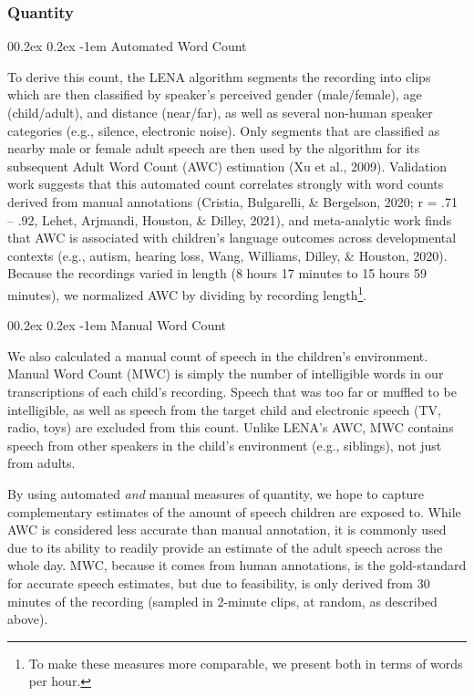 \documentclass[
  man,floatsintext]{apa6}
\makeatletter
\let\oldparagraph\paragraph
\renewcommand{\paragraph}[1]{\oldparagraph{#1}\mbox{}}
\renewcommand{\paragraph}{\@startsection{paragraph}{4}{\parindent}%
  {0\baselineskip \@plus 0.2ex \@minus 0.2ex}%
  {-1em}%
  {\normalfont\normalsize\bfseries\itshape\typesectitle}}
\makeatother
\begin{document}
\hypertarget{quantity}{%
\subsubsection{Quantity}\label{quantity}}

\hypertarget{automated-word-count}{%
\paragraph{Automated Word Count}\label{automated-word-count}}

To derive this count, the LENA algorithm segments the recording into clips which are then classified by speaker's perceived gender (male/female), age (child/adult), and distance (near/far), as well as several non-human speaker categories (e.g., silence, electronic noise). Only segments that are classified as nearby male or female adult speech are then used by the algorithm for its subsequent Adult Word Count (AWC) estimation (Xu et al., 2009). Validation work suggests that this automated count correlates strongly with word counts derived from manual annotations (Cristia, Bulgarelli, \& Bergelson, 2020; r = .71 -- .92, Lehet, Arjmandi, Houston, \& Dilley, 2021), and meta-analytic work finds that AWC is associated with children's language outcomes across developmental contexts (e.g., autism, hearing loss, Wang, Williams, Dilley, \& Houston, 2020). Because the recordings varied in length (8 hours 17 minutes to 15 hours 59 minutes), we normalized AWC by dividing by recording length\footnote{To make these measures more comparable, we present both in terms of words per hour.}.

\hypertarget{manual-word-count}{%
\paragraph{Manual Word Count}\label{manual-word-count}}

We also calculated a manual count of speech in the children's environment. Manual Word Count (MWC) is simply the number of intelligible words in our transcriptions of each child's recording. Speech that was too far or muffled to be intelligible, as well as speech from the target child and electronic speech (TV, radio, toys) are excluded from this count. Unlike LENA's AWC, MWC contains speech from other speakers in the child's environment (e.g., siblings), not just from adults.

By using automated \emph{and} manual measures of quantity, we hope to capture complementary estimates of the amount of speech children are exposed to. While AWC is considered less accurate than manual annotation, it is commonly used due to its ability to readily provide an estimate of the adult speech across the whole day. MWC, because it comes from human annotations, is the gold-standard for accurate speech estimates, but due to feasibility, is only derived from 30 minutes of the recording (sampled in 2-minute clips, at random, as described above).
\end{document}
